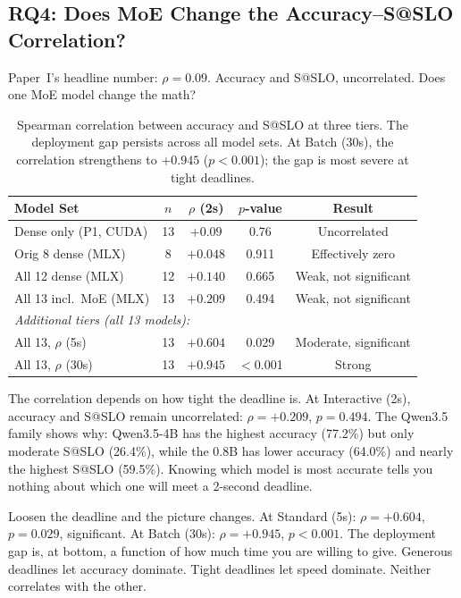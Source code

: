 \documentclass[11pt]{article}
\begin{document}
\subsection{RQ4: Does MoE Change the Accuracy--S@SLO Correlation?}
\label{sec:rq4-correlation}

Paper~I's headline number: $\rho = 0.09$.  Accuracy and S@SLO, uncorrelated.  Does one MoE model change the math?

\begin{table}[t]
\centering
\caption{Spearman correlation between accuracy and S@SLO at three tiers.  The deployment gap persists across all model sets.  At Batch (30s), the correlation strengthens to $+0.945$ ($p < 0.001$); the gap is most severe at tight deadlines.}
\label{tab:correlation-change}
\small
\begin{tabular}{lcccc}
\toprule
\textbf{Model Set} & \textbf{$n$} & \textbf{$\rho$ (2s)} & \textbf{$p$-value} & \textbf{Result} \\
\midrule
Dense only (P1, CUDA) & 13 & $+0.09$ & 0.76 & Uncorrelated \\
Orig 8 dense (MLX) & 8  & $+0.048$ & 0.911 & Effectively zero \\
All 12 dense (MLX) & 12 & $+0.140$ & 0.665 & Weak, not significant \\
All 13 incl.\ MoE (MLX) & 13 & $+0.209$ & 0.494 & Weak, not significant \\
\midrule
\multicolumn{5}{l}{\textit{Additional tiers (all 13 models):}} \\
All 13, $\rho$ (5s) & 13 & $+0.604$ & 0.029 & Moderate, significant \\
All 13, $\rho$ (30s) & 13 & $+0.945$ & $<$0.001 & Strong \\
\bottomrule
\end{tabular}
\end{table}

The correlation depends on how tight the deadline is.  At Interactive (2s), accuracy and S@SLO remain uncorrelated: $\rho = +0.209$, $p = 0.494$.  The Qwen3.5 family shows why: Qwen3.5-4B has the highest accuracy (77.2\%) but only moderate S@SLO (26.4\%), while the 0.8B has lower accuracy (64.0\%) and nearly the highest S@SLO (59.5\%).  Knowing which model is most accurate tells you nothing about which one will meet a 2-second deadline.

Loosen the deadline and the picture changes.  At Standard (5s): $\rho = +0.604$, $p = 0.029$, significant.  At Batch (30s): $\rho = +0.945$, $p < 0.001$.  The deployment gap is, at bottom, a function of how much time you are willing to give.  Generous deadlines let accuracy dominate.  Tight deadlines let speed dominate.  Neither correlates with the other.
\end{document}
